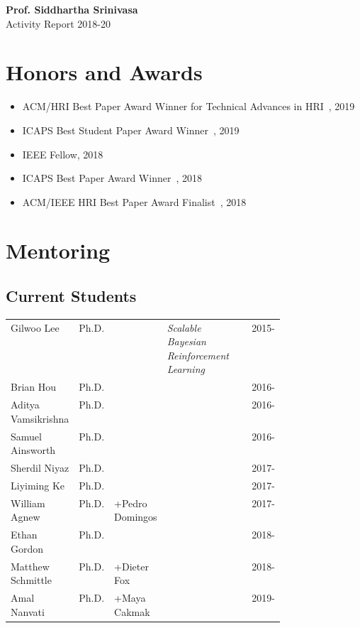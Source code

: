 \documentclass[10pt]{article}
\begin{document}
\pagestyle{empty} %

\par{\centering
		{\bf\LARGE Prof. Siddhartha Srinivasa}\\
		{\Large Activity Report 2018-20}
\bigskip\par}



\section{Honors and Awards}
\begin{itemize}
\addtolength{\itemsep}{-0.5\baselineskip}
\item ACM/HRI Best Paper Award Winner for Technical Advances in HRI~\cite{gallenberger2019skewering}, 2019
\item ICAPS Best Student Paper Award Winner~\cite{mandalika2019gls}, 2019
\item IEEE Fellow, 2018
\item ICAPS Best Paper Award Winner~\cite{haghtalab2018laziness}, 2018
\item ACM/IEEE HRI Best Paper Award Finalist~\cite{chen2018trust}, 2018
\end{itemize}

\section{Mentoring} 
\subsection{Current Students}
\vspace{-1em}
\begin{center}
\begin{tabular}{lrlp{0.45\linewidth}l}
Gilwoo Lee & Ph.D. &  & \textit{Scalable Bayesian Reinforcement Learning} & 2015-\\
Brian Hou & Ph.D. & & & 2016-\\
Aditya Vamsikrishna & Ph.D. & & & 2016-\\
Samuel Ainsworth & Ph.D. & & & 2016-\\
Sherdil Niyaz & Ph.D. & & & 2017-\\
Liyiming Ke & Ph.D. & & & 2017-\\
William Agnew & Ph.D. & +Pedro Domingos & & 2017-\\
Ethan Gordon & Ph.D. &  & & 2018-\\
Matthew Schmittle & Ph.D. & +Dieter Fox & & 2018-\\
Amal Nanvati & Ph.D. & +Maya Cakmak & & 2019-\\
\end{tabular}
\end{center}
\end{document}
